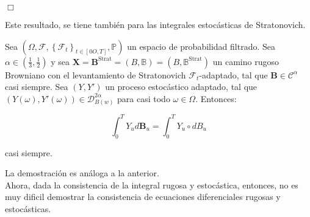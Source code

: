 \begin{flushright}
	$\Box$
\end{flushright}

Este resultado, se tiene también para las integrales estocásticas de Stratonovich.


\begin{prop}
	Sea $(\Omega, \mathcal{F}, \left\{ \mathcal{F}_t \right\}_{t \in [0O,T]}, \mathbb{P}  )$ un espacio de probabilidad filtrado. Sea $\alpha \in \left( \frac{1}{3}, \frac{1}{2} \right)$ y sea $\mathbf{X} = \mathbf{B}^{\text{Strat}} = (B, \mathbb{B}) = (B, \mathbb{B}^{\text{Strat}})$ un camino rugoso Browniano con el levantamiento de Stratonovich $\mathcal{F}_t$-adaptado, tal que $\mathbf{B} \in \mathscr{C}^{\alpha}$ casi siempre. Sea $(Y, Y')$ un proceso estocástico adaptado, tal que $(Y(\omega), Y'(\omega)) \in \mathscr{D}^{2\alpha}_{B(w)}$ para casi todo $\omega \in \Omega$. Entonces:

	\[
		\int_0^T Y_u d\mathbf{B}_u = \int_0^T Y_u \circ dB_u
	\]

	casi siempre.
\end{prop}

La demostración es análoga a la anterior. \\

Ahora, dada la consistencia de la integral rugosa y estocástica, entonces, no es muy dificil demostrar la consistencia de ecuaciones diferenciales rugosas y estocásticas.

